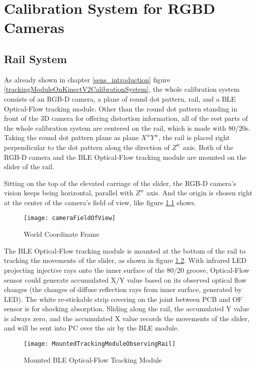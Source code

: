 \chapter{Calibration System for RGBD Cameras} %
\label{sens_CalibrationSystem} %
%
%
\section{Rail System}%
As already shown in chapter \ref{sens_introduction} figure \ref{trackingModuleOnKinectV2CalibrationSystem}, the whole calibration system consists of an RGB-D camera, a plane of round dot pattern, rail, and a BLE Optical-Flow tracking module. 
Other than the round dot pattern standing in front of the 3D camera for offering distortion information, all of the rest parts of the whole calibration system are centered on the rail, which is made with 80/20s. Taking the round dot pattern plane as plane \(X^wY^w\), the rail is placed right perpendicular to the dot pattern along the direction of \(Z^w\) axis. Both of the RGB-D camera and the BLE Optical-Flow tracking module are mounted on the slider of the rail. \par
%
Sitting on the top of the elevated carriage of the slider, the RGB-D camera's vision keeps being horizontal, parallel with \(Z^w\) axis. And the origin is chosen right at the center of the camera's field of view, like figure \ref{cameraFieldOfView} shows.\par
%
\begin{figure}[h]
\centering
\texttt{[image: cameraFieldOfView]}
\caption{World Coordinate Frame}
\label{cameraFieldOfView}
\end{figure}%
%
The BLE Optical-Flow tracking module is mounted at the bottom of the rail to tracking the movements of the slider, as shown in figure \ref{MountedTrackingModuleObservingRail}. With infrared LED projecting injective rays onto the inner surface of the 80/20 groove, Optical-Flow sensor could generate accumulated X/Y value based on its observed optical flow changes (the changes of diffuse reflection rays from inner surface, generated by LED). The white re-stickable strip covering on the joint between PCB and OF sensor is for shocking absorption. Sliding along the rail, the accumulated Y value is always zero, and the accumulated X value records the movements of the slider, and will be sent into PC over the air by the BLE module. 
%
\par
%
\begin{figure}[h]
\centering
\texttt{[image: MountedTrackingModuleObservingRail]}
\caption{Mounted BLE Optical-Flow Tracking Module}
\label{MountedTrackingModuleObservingRail}
\end{figure}%
%
%
%
